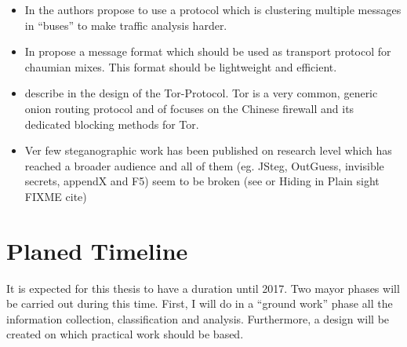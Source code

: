 \documentclass[twocolumn,a4paper,10pt,english]{scrartcl}
\begin{document}
\begin{itemize}
\item In \cite{buses03} the authors \citeauthor{buses03} propose to use a protocol which is clustering multiple messages in ``buses'' to make traffic analysis harder.
\item In \cite{danezis:wpes2004} \citeauthor{danezis:wpes2004} propose a message format which should be used as transport protocol for chaumian mixes. This format should be lightweight and efficient.
\item \citeauthor{tor-design} describe in \cite{tor-design} the design of the Tor-Protocol. Tor is a very common, generic onion routing protocol and \cite{foci12-winter} of \citeauthor{foci12-winter} focuses on the Chinese firewall and its dedicated blocking methods for Tor.
\item Ver few steganographic work has been published on research level which has reached a broader audience and all of them (eg. JSteg, OutGuess, invisible secrets, appendX and F5\cite{f5}) seem to be broken (see \cite{hideAndSeek} or Hiding in Plain sight FIXME cite)
\end{itemize}

\section{Planed Timeline}
It is expected for this thesis to have a duration until 2017. Two mayor phases will be carried out during this time. First, I will do in a ``ground work'' phase all the information collection, classification and analysis. Furthermore, a design will be created on which practical work should be based.\par
\end{document}
